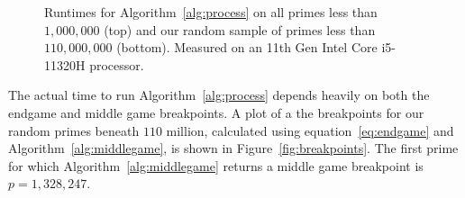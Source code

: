 \documentclass{article}
\theoremstyle{definition}
\theoremstyle{remark}
\begin{document}
\begin{figure}[tbph]
\begin{center}
    

    
    \caption{%
        Runtimes for Algorithm~\ref{alg:process} on all primes less than $1,000,000$ (top) and our random sample of primes less than $110,000,000$ (bottom). 
        Measured on an 11th Gen Intel Core i5-11320H processor.
    }%
    \label{fig:runtimes}
\end{center}
\end{figure}%

The actual time to run Algorithm~\ref{alg:process} depends heavily on both the endgame and middle game breakpoints.
A plot of a the breakpoints for our random primes beneath $110$ million, calculated using equation~\eqref{eq:endgame} and Algorithm~\ref{alg:middlegame}, is shown in Figure~\ref{fig:breakpoints}.
The first prime for which Algorithm~\ref{alg:middlegame} returns a middle game breakpoint is~$p = 1,328,247$.
\end{document}
